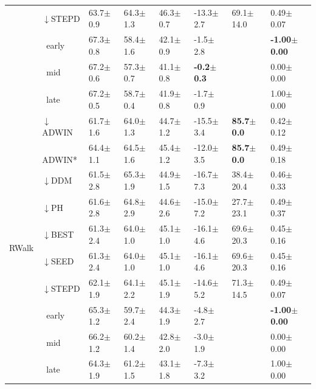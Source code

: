 \begin{tabular}{llllllll}
 & $\downarrow$STEPD & 63.7\tiny{$\pm$0.9} & 64.3\tiny{$\pm$1.3} & 46.3\tiny{$\pm$0.7} & -13.3\tiny{$\pm$2.7} & 69.1\tiny{$\pm$14.0} & 0.49\tiny{$\pm$0.07} \\
 & $\ \;$early & 67.3\tiny{$\pm$0.8} & 58.4\tiny{$\pm$1.6} & 42.1\tiny{$\pm$0.9} & -1.5\tiny{$\pm$2.8} &  & \textbf{-1.00\tiny{$\pm$0.00}} \\
 & $\ \;$mid & 67.2\tiny{$\pm$0.6} & 57.3\tiny{$\pm$0.7} & 41.1\tiny{$\pm$0.8} & \textbf{-0.2\tiny{$\pm$0.3}} &  & 0.00\tiny{$\pm$0.00} \\
 & $\ \;$late & 67.2\tiny{$\pm$0.5} & 58.7\tiny{$\pm$0.4} & 41.9\tiny{$\pm$0.8} & -1.7\tiny{$\pm$0.9} &  & 1.00\tiny{$\pm$0.00} \\
\midrule
\multirow[t]{10}{*}{RWalk} & $\downarrow$ADWIN & 61.7\tiny{$\pm$1.6} & 64.0\tiny{$\pm$1.3} & 44.7\tiny{$\pm$1.2} & -15.5\tiny{$\pm$3.4} & \textbf{85.7\tiny{$\pm$0.0}} & 0.42\tiny{$\pm$0.12} \\
 & $\ \;$ADWIN* & 64.4\tiny{$\pm$1.1} & 64.5\tiny{$\pm$1.6} & 45.4\tiny{$\pm$1.2} & -12.0\tiny{$\pm$3.5} & \textbf{85.7\tiny{$\pm$0.0}} & 0.49\tiny{$\pm$0.18} \\
 & $\downarrow$DDM & 61.5\tiny{$\pm$2.8} & 65.3\tiny{$\pm$1.9} & 44.9\tiny{$\pm$1.5} & -16.7\tiny{$\pm$7.3} & 38.4\tiny{$\pm$20.4} & 0.46\tiny{$\pm$0.33} \\
 & $\downarrow$PH & 61.6\tiny{$\pm$2.8} & 64.8\tiny{$\pm$2.9} & 44.6\tiny{$\pm$2.6} & -15.0\tiny{$\pm$7.2} & 27.7\tiny{$\pm$23.1} & 0.49\tiny{$\pm$0.37} \\
 & $\downarrow$BEST & 61.3\tiny{$\pm$2.4} & 64.0\tiny{$\pm$1.0} & 45.1\tiny{$\pm$1.0} & -16.1\tiny{$\pm$4.6} & 69.6\tiny{$\pm$20.3} & 0.45\tiny{$\pm$0.16} \\
 & $\downarrow$SEED & 61.3\tiny{$\pm$2.4} & 64.0\tiny{$\pm$1.0} & 45.1\tiny{$\pm$1.0} & -16.1\tiny{$\pm$4.6} & 69.6\tiny{$\pm$20.3} & 0.45\tiny{$\pm$0.16} \\
 & $\downarrow$STEPD & 62.1\tiny{$\pm$1.9} & 64.1\tiny{$\pm$2.2} & 45.1\tiny{$\pm$1.9} & -14.6\tiny{$\pm$5.2} & 71.3\tiny{$\pm$14.5} & 0.49\tiny{$\pm$0.07} \\
 & $\ \;$early & 65.3\tiny{$\pm$1.2} & 59.7\tiny{$\pm$2.4} & 44.3\tiny{$\pm$1.9} & -4.8\tiny{$\pm$2.7} &  & \textbf{-1.00\tiny{$\pm$0.00}} \\
 & $\ \;$mid & 66.2\tiny{$\pm$1.2} & 60.2\tiny{$\pm$1.4} & 42.8\tiny{$\pm$2.0} & -3.0\tiny{$\pm$1.9} &  & 0.00\tiny{$\pm$0.00} \\
 & $\ \;$late & 64.3\tiny{$\pm$1.9} & 61.2\tiny{$\pm$1.5} & 43.1\tiny{$\pm$1.8} & -7.3\tiny{$\pm$3.2} &  & 1.00\tiny{$\pm$0.00} \\

\end{tabular}
